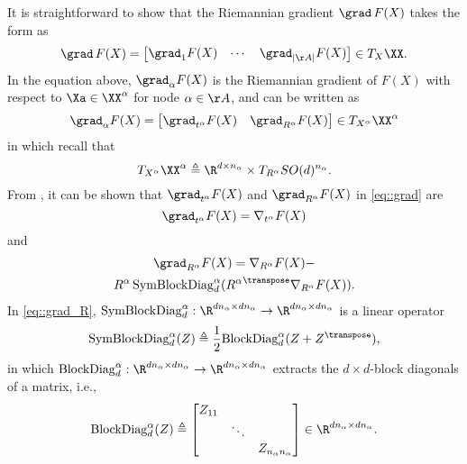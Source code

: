 It is straightforward to show that the Riemannian gradient $\grad\, F(X)$ takes the form as
\begin{equation}
	\nonumber
	\grad\, F(X) =\begin{bmatrix}
		\grad_{1} F(X) & \cdots  & \grad_{|\AA|} F(X)
	\end{bmatrix}\in T_X \XX.
\end{equation}
In the equation above, $\grad_{\alpha} F(X)$ is the Riemannian gradient of $F(X)$ with respect to $\Xa\in\XX^{\alpha}$ for node $\alpha\in\AA$, and can be written as
\begin{equation}\label{eq::grad}
	\grad_\alpha F(X)=
	\begin{bmatrix}
		\grad_{t^\alpha} F(X) & \grad_{R^\alpha} F(X)
	\end{bmatrix}\in
	T_{X^\alpha}\XX^\alpha
\end{equation}
in which recall that $$T_{X^\alpha}\XX^\alpha\triangleq\R^{d\times n_\alpha}\times T_{R^\alpha} SO(d)^{n_\alpha}.$$
From \cite{absil2009optimization,rosen2016se}, it can be shown that $\grad_{t^\alpha} F(X)$ and $\grad_{R^\alpha} F(X)$ in \cref{eq::grad} are
\begin{equation}\label{eq::grad_t}
	\grad_{t^\alpha} F(X) = \nabla_{t^\alpha} F(X)
\end{equation}
and
\begin{multline}\label{eq::grad_R}
	\grad_{R^\alpha} F(X) = \nabla_{R^\alpha} F(X)-\\
	R^\alpha\, \mathrm{SymBlockDiag}_d^\alpha({R^{\alpha}}^\transpose\nabla_{R^\alpha} F(X)).
\end{multline}
In \cref{eq::grad_R}, $\mathrm{SymBlockDiag}_d^\alpha: \R^{dn_\alpha\times dn_\alpha}\rightarrow \R^{dn_\alpha\times dn_\alpha}$ is a linear operator
\begin{equation}\label{eq::sym}
	\mathrm{SymBlockDiag}_d^\alpha(Z)\triangleq\frac{1}{2}\mathrm{BlockDiag}_d^\alpha(Z+Z^\transpose),
\end{equation} 
in which $\mathrm{BlockDiag}_d^\alpha: \R^{dn_\alpha \times dn_\alpha}\rightarrow \R^{dn_\alpha \times dn_\alpha}$ extracts the $d\times d$-block diagonals of a matrix, i.e.,
\begin{equation}
	\nonumber
	\mathrm{BlockDiag}_d^\alpha(Z)\triangleq\begin{bmatrix}
		Z_{11} & & \\
		&\ddots &\\
		& & Z_{n_\alpha n_\alpha}
	\end{bmatrix}\in \R^{dn_\alpha \times dn_\alpha}.
\end{equation}
